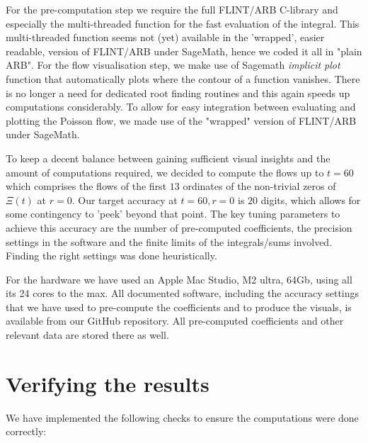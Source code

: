 \documentclass[a4paper,11pt,twoside]{amsart}
\begin{document}
For the pre-computation step we require the full FLINT/ARB C-library and especially the multi-threaded function for the fast evaluation of the integral. This multi-threaded function seems not (yet) available in the 'wrapped', easier readable, version of FLINT/ARB under SageMath, hence we coded it all in "plain ARB". For the flow visualisation step, we make use of Sagemath \textit{implicit plot} function that automatically plots where the contour of a function vanishes. There is no longer a need for dedicated root finding routines and this again speeds up computations considerably. To allow for easy integration between evaluating and plotting the Poisson flow, we made use of the "wrapped" version of FLINT/ARB under SageMath.    

To keep a decent balance between gaining sufficient visual insights and the amount of computations required, we decided to compute the flows up to $t=60$ which comprises the flows of the first $13$ ordinates of the non-trivial zeros of $\Xi(t)$ at $r=0$. Our target accuracy at $t=60, r=0$ is $20$ digits, which allows for some contingency to 'peek' beyond that point. The key tuning parameters to achieve this accuracy are the number of pre-computed coefficients, the precision settings in the software and the finite limits of the integrals/sums involved. Finding the right settings was done heuristically. 

For the hardware we have used an Apple Mac Studio, M2 ultra, 64Gb, using all its 24 cores to the max. All documented software, including the accuracy settings that we have used to pre-compute the coefficients and to produce the visuals, is available from our GitHub \cite{git} repository. All pre-computed coefficients and other relevant data are stored there as well.
\pagebreak
\section{Verifying the results}\label{checks}
We have implemented the following checks to ensure the computations were done correctly:
\end{document}
